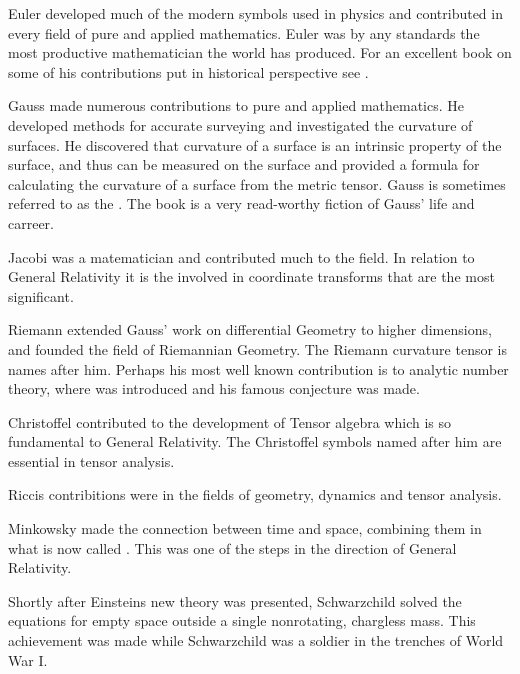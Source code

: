 {Euler developed much of the modern symbols used in physics and contributed
in every field of pure and applied mathematics. Euler was by any standards
the most productive mathematician the world has produced. For an excellent book
on some of his contributions put in historical perspective see \cite{dunham}.}

{Gauss made numerous contributions to pure and applied mathematics. He developed
methods for accurate surveying and investigated the curvature of surfaces. He 
discovered that curvature of a surface is an intrinsic property of the surface,
and thus can be measured on the surface and provided a formula for 
calculating the curvature of a surface from the metric tensor. Gauss is 
sometimes referred to as the .  
The book \cite{gauss} is a very read-worthy fiction of Gauss' life and carreer.}

{Jacobi was a matematician and contributed much to the field. In relation
to General Relativity it is the  involved in coordinate
transforms that are the most significant.}

{Riemann extended Gauss' work on differential Geometry to higher
dimensions, and founded the field of Riemannian Geometry. The Riemann curvature 
tensor is names after him. Perhaps his most well known contribution
is to analytic number theory, where  was 
introduced and his famous conjecture was made.}

{Christoffel contributed to the development of Tensor algebra
which is so fundamental to General Relativity. The Christoffel
symbols named after him are essential in tensor analysis.}

{Riccis contribitions were in the fields of geometry, dynamics
and tensor analysis.}

{Minkowsky made the connection between time and space, combining
them in what is now called . This was one of the steps
in the direction of General Relativity.}

{Shortly after Einsteins new theory was presented, Schwarzchild
solved the equations for empty space outside a single nonrotating, chargless mass.
This achievement was made while Schwarzchild was a soldier in the trenches 
of World War I.}

